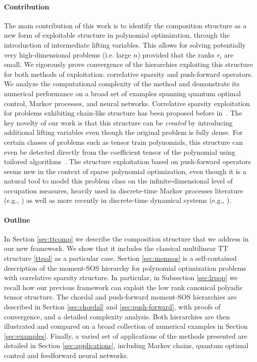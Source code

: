\documentclass[11pt,a4paper]{article}
\theoremstyle{definition}
\begin{document}
\paragraph{Contribution}
The main contribution of this work is to identify the composition structure as a new form of exploitable structure in polynomial optimization, through the introduction of intermediate lifting variables. This allows for solving  potentially very high-dimensional problems (i.e. large $n$) provided that the ranks $r_i$ are small. We rigorously prove convergence of the hierarchies exploiting this structure for both methods of exploitation: correlative sparsity and push-forward operators. We analyze the computational complexity of the method and demonstrate its numerical performance on a broad set of examples spanning quantum optimal control, Markov processes, and neural networks. Correlative sparsity exploitation for problems exhibiting chain-like structure has been proposed before in~\cite{teng2025convex,kang2024fast}. The key novelty of our work is that this structure can be \emph{created} by introducing additional lifting variables even though the original problem is fully dense. For certain classes of problems such as tensor train polynomials, this structure can even be detected directly from the coefficient tensor of the polynomial using tailored algorithms~\cite{oseledets2011tensor}. The structure exploitation based on push-forward operators seems new in the context of sparse polynomial optimization, even though it is a natural tool to model this problem class on the infinite-dimensional level of occupation measures, heavily used in discrete-time Markov processes literature (e.g., \cite{hernandez2012discrete}) as well as more recently in discrete-time dynamical systems (e.g., \cite{korda2014convex}).

\paragraph{Outline}
In Section \ref{sec:ttcomp} we describe the composition structure  that we  address in our new framework. We show that it includes the classical multilinear TT structure \eqref{ttpol} as a particular case. Section \ref{sec:momsos} is a self-contained description of the moment-SOS hierarchy for polynomial optimization problems with correlative sparsity structure. In particular, in Subsection \ref{sec:lrpop} we recall how our previous framework can exploit the low rank canonical polyadic tensor structure. The chordal and push-forward moment-SOS hierarchies are described in Section \ref{sec:chordal} and \ref{sec:push-forward}, with proofs of convergence, and a detailed complexity analysis. Both hierarchies are then illustrated and compared on a broad collection of numerical examples in Section \ref{sec:examples}. Finally, a varied set of applications of the methods presented are detailed in Section \ref{sec:applications}, including Markov chains, quantum optimal control and feedforward neural networks.
\end{document}
